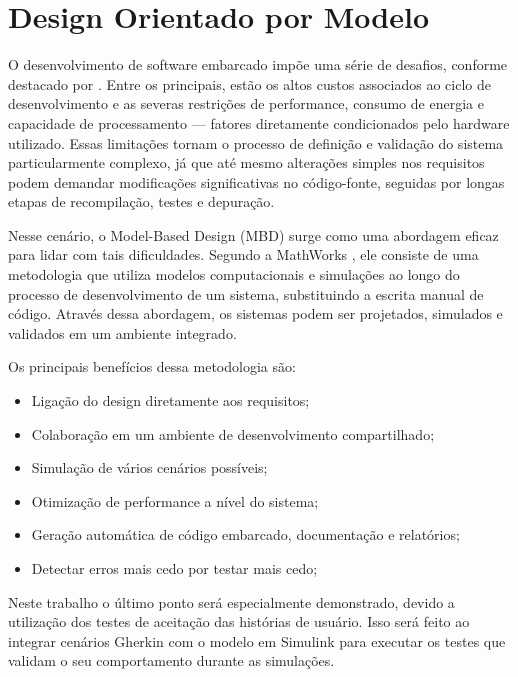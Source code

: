 
\section{Design Orientado por Modelo}
O desenvolvimento de software embarcado impõe uma série de desafios, conforme destacado por \cite{Vincentelli2001}. Entre os principais, estão os altos custos associados 
ao ciclo de desenvolvimento e as severas restrições de performance, consumo de energia e capacidade de processamento — fatores diretamente condicionados pelo 
hardware utilizado. Essas limitações tornam o processo de definição e validação do sistema particularmente complexo, já que até mesmo alterações simples nos 
requisitos podem demandar modificações significativas no código-fonte, seguidas por longas etapas de recompilação, testes e depuração.

Nesse cenário, o Model-Based Design (MBD) surge como uma abordagem eficaz para lidar com tais dificuldades. Segundo a MathWorks \cite{mathworksMBD2024}, ele 
consiste de uma metodologia que utiliza modelos computacionais e simulações ao longo do processo de desenvolvimento de um sistema, substituindo a escrita manual 
de código. Através dessa abordagem, os sistemas podem ser projetados, simulados e validados em um ambiente integrado.

Os principais benefícios dessa metodologia são:

\begin{itemize}
	\item Ligação do design diretamente aos requisitos;
	\item Colaboração em um ambiente de desenvolvimento compartilhado;
	\item Simulação de vários cenários possíveis;
	\item Otimização de performance a nível do sistema;
	\item Geração automática de código embarcado, documentação e relatórios;
	\item Detectar erros mais cedo por testar mais cedo;
\end{itemize}

Neste trabalho o último ponto será especialmente demonstrado, devido a utilização dos testes de aceitação das histórias de usuário. Isso será feito ao integrar 
cenários Gherkin com o modelo em Simulink para executar os testes que validam o seu comportamento durante as simulações.

